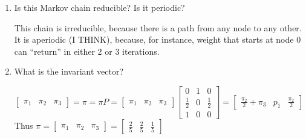 \begin{enumerate}
\item
Is this Markov chain reducible? Is it periodic?
\begin{solution}[2cm]
This chain is irreducible, because there is a path from any node to any 
other. It is aperiodic (I THINK), because, for instance, weight that 
starts at node 0 can “return” in either 2 or 3 iterations.
\end{solution}

\item
What is the invariant vector?
\begin{solution}[4cm]
$\begin{bmatrix} \pi_1 & \pi_2 & \pi_3 \end{bmatrix}
= \pi = \pi P = 
\begin{bmatrix} \pi_1 & \pi_2 & \pi_3 \end{bmatrix}
\begin{bmatrix}
0 & 1 & 0 \\ \frac{1}{2} & 0 & \frac{1}{2} \\ 1 & 0 & 0 
\end{bmatrix} = 
\begin{bmatrix} \frac{\pi_2}{2} + \pi_3 & p_1 & \frac{\pi_2}{2} \end{bmatrix}
$
Thus
$ \pi = \begin{bmatrix} \pi_1 & \pi_2 & \pi_3 \end{bmatrix}
= \begin{bmatrix} \frac{2}{5} & \frac{2}{5} & \frac{1}{5} \end{bmatrix}
$
\end{solution}


\end{enumerate}
